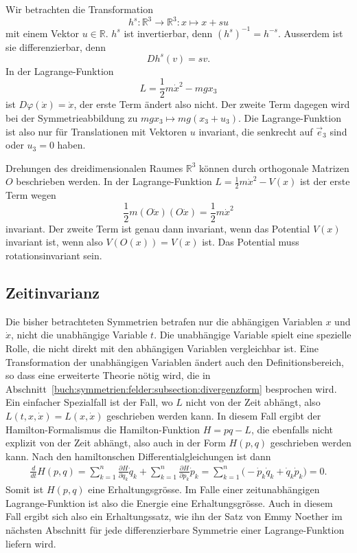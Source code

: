 \begin{beispiel}
\label{buch:symmetrien:symmetrie:beispiel:homogen}
Wir betrachten die Transformation
\[
h^s
\colon
\mathbb{R}^3 \to \mathbb{R}^3
:
x \mapsto x + su
\]
mit einem Vektor $u\in\mathbb{R}$.
$h^s$ ist invertierbar, denn $(h^s)^{-1}=h^{-s}$.
Ausserdem ist sie differenzierbar, denn
\[
Dh^s(v)
=
sv.
\]
In der Lagrange-Funktion
\[
L
=
\frac12m\dot{x}^2 - mgx_3
\]
ist $D\varphi(\dot{x})=\dot{x}$, der erste Term ändert also nicht.
Der zweite Term dagegen wird bei der Symmetrieabbildung zu
$mgx_3\mapsto mg(x_3+u_3)$.
Die Lagrange-Funktion ist also nur für Translationen mit Vektoren $u$
invariant, die senkrecht auf $\vec{e}_3$ sind oder $u_3=0$ haben.
\end{beispiel}

\begin{beispiel}
\label{buch:symmetrien:symmetrie:beispiel:drehung}
Drehungen des dreidimensionalen Raumes $\mathbb{R}^3$ können durch
orthogonale Matrizen $O$ beschrieben werden.
In der Lagrange-Funktion $L=\frac12m\dot{x}^2-V(x)$ ist der erste
Term wegen
\[
\frac12m (O\dot{x})(O\dot{x})
=
\frac12m\dot{x}^2
\]
invariant.
Der zweite Term ist genau dann invariant, wenn das Potential $V(x)$
invariant ist, wenn also $V(O(x))=V(x)$ ist.
Das Potential muss rotationsinvariant sein.
\end{beispiel}

%
%
\subsection{Zeitinvarianz}
Die bisher betrachteten Symmetrien betrafen nur die abhängigen
Variablen $x$ und $\dot{x}$, nicht die unabhängige Variable $t$.
Die unabhängige Variable spielt eine spezielle Rolle, die nicht
direkt mit den abhängigen Variablen vergleichbar ist.
Eine Transformation der unabhängigen Variablen ändert auch den
Definitionsbereich, so dass eine erweiterte Theorie nötig wird, 
die in Abschnitt~\ref{buch:symmetrien:felder:subsection:divergenzform}
besprochen wird.
Ein einfacher Spezialfall ist der Fall, wo $L$ nicht von der
Zeit abhängt, also $L(t,x,\dot{x})=L(x,\dot{x})$ geschrieben werden
kann.
In diesem Fall ergibt der Hamilton-Formalismus die Hamilton-Funktion
$H=pq-L$, die ebenfalls nicht explizit von der Zeit abhängt, also
auch in der Form $H(p,q)$ geschrieben werden kann.
Nach den hamiltonschen Differentialgleichungen ist dann
\begin{align*}
\frac{d}{dt}H(p,q)
=
\sum_{k=1}^n
\frac{\partial H}{\partial q_k}\dot{q}_k
+
\sum_{k=1}^n
\frac{\partial H}{\partial p_k}\dot{p}_k
=
\sum_{k=1}^n
\bigl(
-
\dot{p}_k\dot{q}_k
+
\dot{q}_k\dot{p}_k
\bigr)
=
0.
\end{align*}
Somit ist $H(p,q)$ eine Erhaltungsgrösse.
Im Falle einer zeitunabhängigen Lagrange-Funk\-tion ist also die
Energie eine Erhaltungsgrösse.
Auch in diesem Fall ergibt sich also ein Erhaltungssatz, wie ihn
der Satz von Emmy Noether im nächsten Abschnitt für jede differenzierbare
Symmetrie einer Lagrange-Funktion liefern wird.

